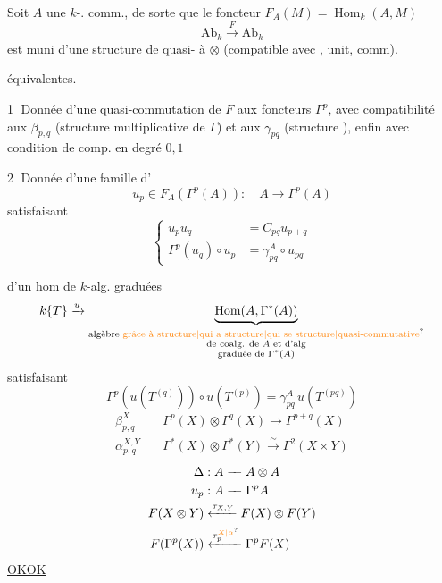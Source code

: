 Soit $A$ une $k$-.   comm., de sorte que le foncteur $F_A(M)=\operatorname{Hom}_k(A,M)$
\[
\mathrm{Ab}_k\xrightarrow{F}\mathrm{Ab}_k
\]
est muni d'une structure de quasi- à $\otimes$ (compatible avec , unit, comm).

  équivalentes.

\textcircled{1} Donnée d'une quasi-commutation de $F$ aux foncteurs $\Gamma^p$, avec compatibilité aux $\beta_{p,q}$ (structure multiplicative de $\Gamma$) et aux $\gamma_{pq}$ (structure ), enfin avec condition de comp. en degré $0,1$

\textcircled{2} Donnée d'une famille d'
\[
u_p\in F_A(\Gamma^p(A)):\quad A\longrightarrow\Gamma^p(A)
\]
satisfaisant
\[
\left\{\begin{aligned}
u_pu_q&=C_{pq}u_{p+q}\\
\Gamma^p(u_q)\circ u_p&=\gamma^A_{pq}\circ u_{pq}
\end{aligned}\right.
\]

 d'un hom  de $k$-alg. graduées
\[
k\{T\}\xrightarrow{u}\underbrace{\operatorname{Hom}(A,\Gamma^*(A))}_{\substack{\text{algèbre \unsure{grâce à structure|qui a structure|qui se structure|quasi-commutative}}\\\text{de coalg. de }A\text{ et d'alg}\\\text{graduée de }\Gamma^*(A)}}
\]
satisfaisant
\[
\Gamma^p(u(T^{(q)}))\circ u(T^{(p)})=\gamma^A_{pq}\,u(T^{(pq)})
\]
\[
\begin{aligned}
\beta^X_{p,q}\quad&\Gamma^p(X)\otimes\Gamma^q(X)\longrightarrow\Gamma^{p+q}(X)\\
\alpha^{X,Y}_{p,q}\quad&\Gamma^*(X)\otimes\Gamma^*(Y)\xrightarrow{\sim}\Gamma^{2}(X\times Y)
\end{aligned}
\]
\[
\begin{aligned}
\Delta&:A\mathrel{-\!\!-}A\otimes A\\
u_p&:A\mathrel{-\!\!-}\Gamma^p A\\
F(X\otimes Y)&\xleftarrow{\tau_{X,Y}}F(X)\otimes F(Y)\\
F(\Gamma^p(X))&\xleftarrow{\tau_p^{\unsure{X|\alpha}}}\Gamma^p F(X)
\end{aligned}
\]
\uline{OK\quad OK}

